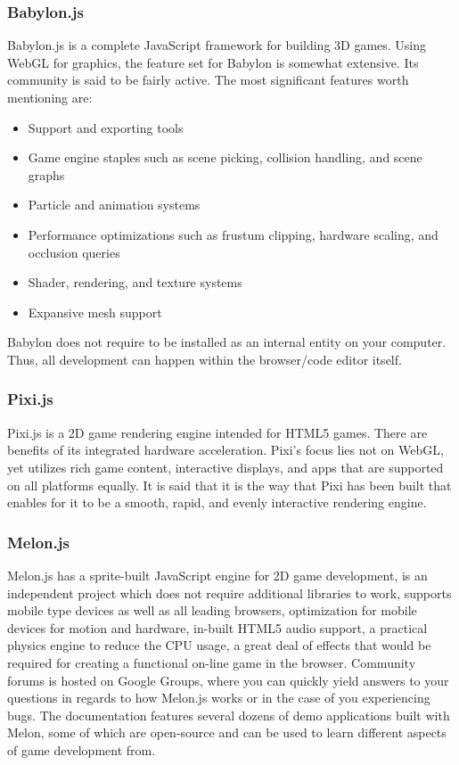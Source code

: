 \subsubsection{Babylon.js}
Babylon.js is a complete JavaScript framework for building 3D games.
Using WebGL for graphics, the feature set for Babylon is somewhat extensive.
Its community is said to be fairly active.
The most significant features worth mentioning are:

\begin{itemize}
    \item Support and exporting tools
    \item Game engine staples such as scene picking, collision handling, and scene graphs
    \item Particle and animation systems
    \item Performance optimizations such as frustum clipping, hardware scaling, and occlusion queries
    \item Shader, rendering, and texture systems
    \item Expansive mesh support
\end{itemize}

Babylon does not require to be installed as an internal entity on your computer.
Thus, all development can happen within the browser/code editor itself\cite{phaserad}.

\subsubsection{Pixi.js}
Pixi.js is a 2D game rendering engine intended for HTML5 games.
There are benefits of its integrated hardware acceleration.
Pixi’s focus lies not on WebGL, yet utilizes rich game content, interactive displays,
and apps that are supported on all platforms equally.
It is said that it is the way that Pixi has been built that enables for it to be a smooth, rapid, and evenly interactive rendering engine\cite{phaserad}.

\subsubsection{Melon.js}
Melon.js has a sprite-built JavaScript engine for 2D game development,
is an independent project which does not require additional libraries to work,
supports mobile type devices as well as all leading browsers,
optimization for mobile devices for motion and hardware,
in-built HTML5 audio support,
a practical physics engine to reduce the CPU usage,
a great deal of effects that would be required for creating a
functional on-line game in the browser.
Community forums is hosted on Google Groups, where you can quickly yield answers to your questions in regards to how Melon.js works or in the case of you experiencing bugs.
The documentation features several dozens of demo applications built with Melon,
some of which are open-source and can be used to learn different aspects of game development from\cite{phaserad}.

